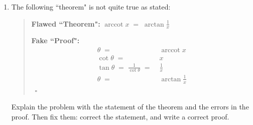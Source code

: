 \documentclass[12pt]{exam}
\newcommand {\DS} [1] {${\displaystyle #1}$}
\DeclareMathOperator{\arccot}{arccot}
\begin{document}
\begin{enumerate}
\begin{enumerate}
		\item The following ``theorem" is not quite true as stated:
		
			\begin{quotation}
			{\bf Flawed ``Theorem":}   \DS{ \arccot x \; = \; \arctan \frac{1}{x} }
			
			{\bf Fake ``Proof":}   \vspace{-.5cm}
				\begin{align*}
					\theta \; =& \; \arccot x \\
					 \cot \theta \; =& \;  x \\
					 \tan \theta \; = \; \frac{1}{\cot \theta} \; =& \; \frac{1}{x} \\
					 \theta  \; =& \;  \arctan \frac{1}{x}  
				\end{align*}
				\ \hfill $\square$
			\end{quotation}

	Explain the problem with the statement of the theorem and the errors in the proof.  Then fix them: correct the statement, and write a correct proof.
	\end{enumerate}


\end{enumerate}
\end{document}
